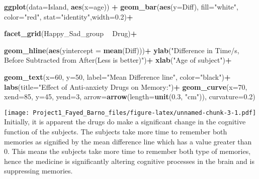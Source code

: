\documentclass[
]{article}
\newenvironment{Shaded}{\begin{snugshade}}{\end{snugshade}}
\newcommand{\DataTypeTok}[1]{\textcolor[rgb]{0.13,0.29,0.53}{#1}}
\newcommand{\DecValTok}[1]{\textcolor[rgb]{0.00,0.00,0.81}{#1}}
\newcommand{\FloatTok}[1]{\textcolor[rgb]{0.00,0.00,0.81}{#1}}
\newcommand{\KeywordTok}[1]{\textcolor[rgb]{0.13,0.29,0.53}{\textbf{#1}}}
\newcommand{\NormalTok}[1]{#1}
\newcommand{\OperatorTok}[1]{\textcolor[rgb]{0.81,0.36,0.00}{\textbf{#1}}}
\newcommand{\StringTok}[1]{\textcolor[rgb]{0.31,0.60,0.02}{#1}}
\begin{document}
\begin{Shaded}
\begin{Highlighting}[]
  \KeywordTok{ggplot}\NormalTok{(}\DataTypeTok{data=}\NormalTok{Island, }\KeywordTok{aes}\NormalTok{(}\DataTypeTok{x=}\NormalTok{age)) }\OperatorTok{+}\StringTok{ }
\StringTok{  }
\StringTok{  }\KeywordTok{geom_bar}\NormalTok{(}\KeywordTok{aes}\NormalTok{(}\DataTypeTok{y=}\NormalTok{Diff), }\DataTypeTok{fill=}\StringTok{"white"}\NormalTok{, }\DataTypeTok{color=}\StringTok{"red"}\NormalTok{, }\DataTypeTok{stat=}\StringTok{"identity"}\NormalTok{,}\DataTypeTok{width=}\FloatTok{0.2}\NormalTok{)}\OperatorTok{+}

\KeywordTok{facet_grid}\NormalTok{(Happy_Sad_group }\OperatorTok{~}\StringTok{ }\NormalTok{Drug)}\OperatorTok{+}

\KeywordTok{geom_hline}\NormalTok{(}\KeywordTok{aes}\NormalTok{(}\DataTypeTok{yintercept =} \KeywordTok{mean}\NormalTok{(Diff)))}\OperatorTok{+}
\StringTok{  }
\StringTok{  }\KeywordTok{ylab}\NormalTok{(}\StringTok{"Difference in Time/s, Before Subtracted from After(Less is better)"}\NormalTok{)}\OperatorTok{+}
\StringTok{  }
\StringTok{  }\KeywordTok{xlab}\NormalTok{(}\StringTok{"Age of subject"}\NormalTok{)}\OperatorTok{+}

\StringTok{  }\KeywordTok{geom_text}\NormalTok{(}\DataTypeTok{x=}\DecValTok{60}\NormalTok{, }\DataTypeTok{y=}\DecValTok{50}\NormalTok{, }\DataTypeTok{label=}\StringTok{"Mean Difference line"}\NormalTok{, }\DataTypeTok{color=}\StringTok{"black"}\NormalTok{)}\OperatorTok{+}
\StringTok{  }
\StringTok{  }\KeywordTok{labs}\NormalTok{(}\DataTypeTok{title=}\StringTok{"Effect of Anti-anxiety Drugs on Memory:"}\NormalTok{)}\OperatorTok{+}
\StringTok{  }\KeywordTok{geom_curve}\NormalTok{(}\DataTypeTok{x=}\DecValTok{70}\NormalTok{, }\DataTypeTok{xend=}\DecValTok{85}\NormalTok{, }\DataTypeTok{y=}\DecValTok{45}\NormalTok{, }\DataTypeTok{yend=}\DecValTok{3}\NormalTok{, }\DataTypeTok{arrow=}\KeywordTok{arrow}\NormalTok{(}\DataTypeTok{length=}\KeywordTok{unit}\NormalTok{(}\FloatTok{0.3}\NormalTok{, }\StringTok{"cm"}\NormalTok{)), }\DataTypeTok{curvature=}\FloatTok{0.2}\NormalTok{) }
\end{Highlighting}
\end{Shaded}

\texttt{[image: Project1\_Fayed\_Barno\_files/figure-latex/unnamed-chunk-3-1.pdf]}
Initially, it is apparent the drugs do make a significant change in the
cognitive function of the subjects. The subjects take more time to
remember both memories as signified by the mean difference line which
has a value greater than 0. This means the subjects take more time to
remember both type of memories, hence the medicine is significantly
altering cognitive processes in the brain and is suppressing memories.
\end{document}
